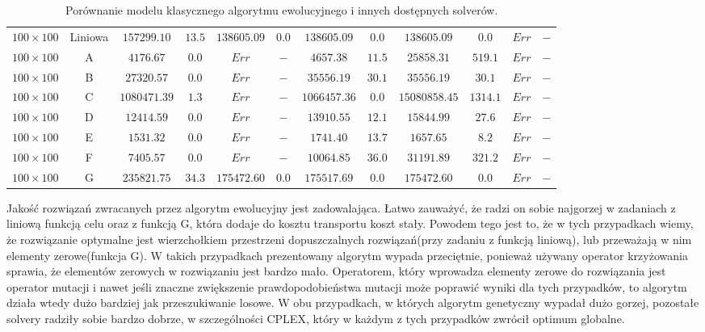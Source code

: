 \begin{table}[h!]
\begin{center}
{\begin{tabular}{c|c|c|c|c|c|c|c|c|c|c|c}
            \hline
            $100 \times 100$ & Liniowa   & $157299.10$ & $13.5$                  & $138605.09$ & $0.0$        & $138605.09$ & $0.0$       & $138605.09$ & $0.0$       & $Err$ & $-$ \\
            $100 \times 100$ & A         & $4176.67$ & $0.0$                     & $Err$ & $-$                & $4657.38$ & $11.5$        & $25858.31$ & $519.1$      & $Err$ & $-$ \\
            $100 \times 100$ & B         & $27320.57$ & $0.0$                    & $Err$ & $-$                & $35556.19$ & $30.1$       & $35556.19$ & $30.1$       & $Err$ & $-$ \\
            $100 \times 100$ & C         & $1080471.39$ & $1.3$                  & $Err$ & $-$                & $1066457.36$ & $0.0$      & $15080858.45$ & $1314.1$  & $Err$ & $-$ \\
            $100 \times 100$ & D         & $12414.59$ & $0.0$                    & $Err$ & $-$                & $13910.55$ & $12.1$       & $15844.99$ & $27.6$       & $Err$ & $-$ \\
            $100 \times 100$ & E         & $1531.32$ & $0.0$                     & $Err$ & $-$                & $1741.40$ & $13.7$        & $1657.65$ & $8.2$         & $Err$ & $-$ \\
            $100 \times 100$ & F         & $7405.57$ & $0.0$                     & $Err$ & $-$                & $10064.85$ & $36.0$       & $31191.89$ & $321.2$      & $Err$ & $-$ \\
            $100 \times 100$ & G         & $235821.75$ & $34.3$                  & $175472.60$ & $0.0$        & $175517.69$ & $0.0$       & $175472.60$ & $0.0$       & $Err$ & $-$ \\
        \end{tabular}
        }
    \end{center}
    \caption{Porównanie modelu klasycznego algorytmu ewolucyjnego i innych dostępnych solverów.}
    \label{wyniki-2}
\end{table}

Jakość rozwiązań zwracanych przez algorytm ewolucyjny jest zadowalająca. Łatwo zauważyć, że radzi on sobie najgorzej w zadaniach z liniową funkcją celu 
oraz z funkcją G, która dodaje do kosztu transportu koszt stały. Powodem tego jest to, że w tych przypadkach wiemy, że rozwiązanie optymalne jest 
wierzchołkiem przestrzeni dopuszczalnych rozwiązań(przy zadaniu z funkcją liniową\cite{ALG-GEN-BOOK}), lub przeważają w nim elementy zerowe(funkcja G). 
W takich przypadkach prezentowany algorytm wypada przeciętnie, ponieważ używany operator krzyżowania sprawia, że elementów zerowych w rozwiązaniu 
jest bardzo mało. Operatorem, który wprowadza elementy zerowe do rozwiązania jest operator mutacji i nawet jeśli znaczne zwiększenie prawdopodobieństwa 
mutacji może poprawić wyniki dla tych przypadków, to algorytm działa wtedy dużo bardziej jak przeszukiwanie losowe. W obu przypadkach, w których 
algorytm genetyczny wypadał dużo gorzej, pozostałe solvery radziły sobie bardzo dobrze, w szczególności CPLEX, który w każdym z tych przypadków zwrócił 
optimum globalne. 

